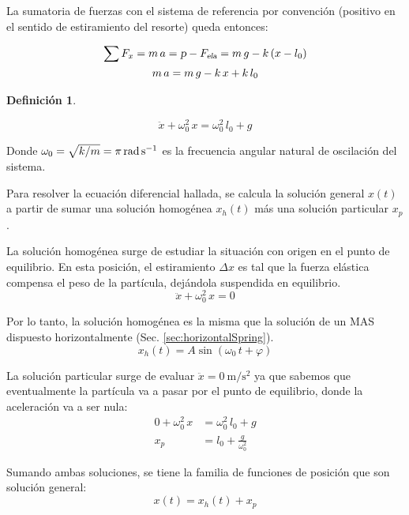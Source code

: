 \documentclass[a5paper,12pt,twoside]{book}
\newtheorem{defn}{{Definición}}[chapter]
\begin{document}
La sumatoria de fuerzas con el sistema de referencia por convención (positivo en el sentido de estiramiento del resorte) queda entonces:

\begin{gather*}
    \sum F_x = m \, a = \textsl{p} - {{F}_\textsl{{ela}}}  = m \, g - k \left(x-l_0\right)
    \\
    m \, a = m \, g - k \, x + k \, l_0
\end{gather*}

\begin{mdframed}[style=MyFrame1]
    \begin{defn}
        \label{defn:}
    \end{defn}
    \begin{equation*}
        \ddot{x} + \omega_0^2 \, x = \omega_0^2 \, l_0 + g
    \end{equation*}
\end{mdframed}

Donde $\omega_0 = \sqrt{k/m}=\pi\,\si{\radian\per\second}$ es la frecuencia angular natural de oscilación del sistema.

Para resolver la ecuación diferencial hallada, se calcula la solución general $x(t)$ a partir de sumar una solución homogénea $x_h(t)$ más una solución particular $x_p$.

La solución homogénea surge de estudiar la situación con origen en el punto de equilibrio.
En esta posición, el estiramiento $\Delta x$ es tal que la fuerza elástica compensa el peso de la partícula, dejándola suspendida en equilibrio.
\[ \ddot{x} + \omega_0^2 \, x = 0 \]

Por lo tanto, la solución homogénea es la misma que la solución de un MAS dispuesto horizontalmente (Sec. \ref{sec:horizontalSpring}).
\[ x_h(t) = A \sin{(\omega_0 \, t + \varphi)} \]

La solución particular surge de evaluar $\ddot{x} = \SI{0}{\metre \per \second^2}$ ya que sabemos que eventualmente la partícula va a pasar por el punto de equilibrio, donde la aceleración va a ser nula:
\begin{align*}
    0 + \omega_0^2 \, x &= \omega_0^2 \, l_0 + g
    \\
    x_p &= l_0 + \frac{g}{\omega_0^2}
\end{align*}

Sumando ambas soluciones, se tiene la familia de funciones de posición que son solución general:
\begin{equation*}
    x(t) = x_h(t) + x_p
\end{equation*}
\end{document}

